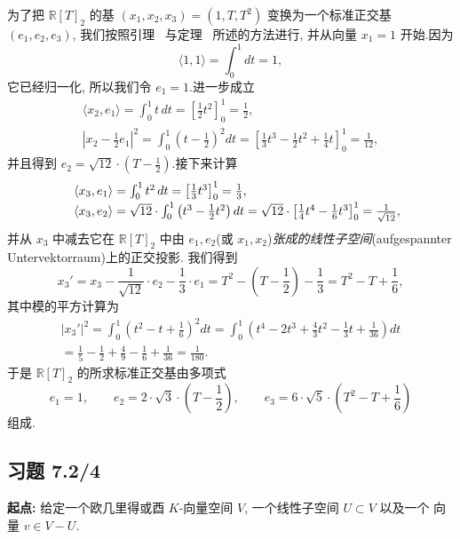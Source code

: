 为了把 $\mathbb{R}[T]_2$ 的基 $(x_1, x_2, x_3) = (1, T, T^2)$ 变换为一个标准正交基
$(e_1, e_2, e_3)$, 我们按照引理~ 与定理~ 所述的方法进行, 并从向量
$x_1 = 1$ 开始.因为
\[
\langle 1, 1 \rangle = \int_0^1 dt = 1,
\]
它已经归一化, 所以我们令 $e_1 = 1$.进一步成立
\[
\begin{array}{c}
\langle x_2, e_1 \rangle = \int_0^1 t\, dt = \left[ \frac{1}{2} t^2 \right]_0^1 = \frac{1}{2}, \\[2pt]
\left| x_2 - \frac{1}{2} e_1 \right|^2 = \int_0^1 \left( t - \frac{1}{2} \right)^2 dt = \left[ \frac{1}{3} t^3 - \frac{1}{2} t^2 + \frac{1}{4} t \right]_0^1 = \frac{1}{12},
\end{array}
\]
并且得到 $e_2 = \sqrt{12} \cdot \left( T - \frac{1}{2} \right)$.接下来计算
\[
\begin{array}{r l}
& \langle x_3, e_1 \rangle = \int_0^1 t^2\, dt = \left[ \frac{1}{3} t^3 \right]_0^1 = \frac{1}{3}, \\[2pt]
& \langle x_3, e_2 \rangle = \sqrt{12} \cdot \int_0^1 \left( t^3 - \frac{1}{2} t^2 \right) dt = \sqrt{12} \cdot \left[ \frac{1}{4} t^4 - \frac{1}{6} t^3 \right]_0^1 = \frac{1}{\sqrt{12}},
\end{array}
\]
并从 $x_3$ 中减去它在 $\mathbb{R}[T]_2$ 中由 $e_1, e_2$(或 $x_1, x_2$)\emph{张成的线性子空间}(\textup{aufgespannter Untervektorraum})上的正交投影.
我们得到
\[
x_3' = x_3 - \frac{1}{\sqrt{12}} \cdot e_2 - \frac{1}{3} \cdot e_1 = T^2 - \left( T - \frac{1}{2} \right) - \frac{1}{3} = T^2 - T + \frac{1}{6},
\]
其中模的平方计算为
\[
\begin{array}{c}
|x_3'|^2 = \int_0^1 \left( t^2 - t + \frac{1}{6} \right)^2 dt = \int_0^1 \left( t^4 - 2 t^3 + \frac{4}{3} t^2 - \frac{1}{3} t + \frac{1}{36} \right) dt \\[2pt]
= \frac{1}{5} - \frac{1}{2} + \frac{4}{9} - \frac{1}{6} + \frac{1}{36} = \frac{1}{180}\text{.}
\end{array}
\]
于是 $\mathbb{R}[T]_2$ 的所求标准正交基由多项式
\[
e_1 = 1, \qquad e_2 = 2 \cdot \sqrt{3} \cdot \left( T - \frac{1}{2} \right), \qquad e_3 = 6 \cdot \sqrt{5} \cdot \left( T^2 - T + \frac{1}{6} \right)
\]
组成.

\subsection*{习题 7.2/4}

\noindent\textbf{起点:} 给定一个欧几里得或酉 $K$-向量空间 $V$, 一个线性子空间 $U \subset V$ 以及一个
向量 $v \in V - U$.

